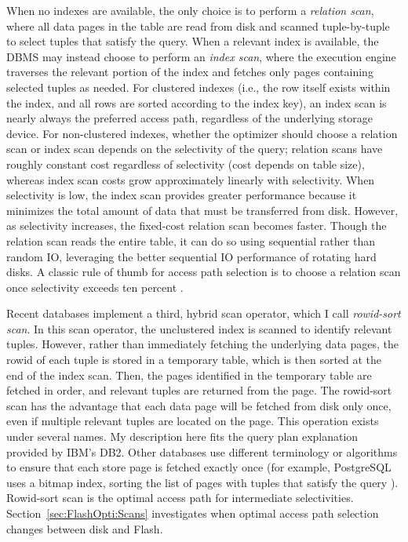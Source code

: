 When no indexes are available, the only choice is to perform a \emph{relation scan}, where all data pages in the table are read from disk and scanned tuple-by-tuple to select tuples that satisfy the query.
When a relevant index is available, the DBMS may instead choose to perform an \emph{index scan}, where the execution engine traverses the relevant portion of the index and fetches only pages containing selected tuples as needed.
For clustered indexes (i.e., the row itself exists within the index, and all rows are sorted according to the index key), an index scan is nearly always the preferred access path, regardless of the underlying storage device.  
For non-clustered indexes, whether the optimizer should choose a relation scan or index scan depends on the selectivity of the query; relation scans have roughly constant cost regardless of selectivity (cost depends on table size), whereas index scan costs grow approximately linearly with selectivity.
When selectivity is low, the index scan provides greater performance because it minimizes the total amount of data that must be transferred from disk.
However, as selectivity increases, the fixed-cost relation scan becomes faster.  
Though the relation scan reads the entire table, it can do so using sequential rather than random IO, leveraging the better sequential IO performance of rotating hard disks.
A classic rule of thumb for access path selection is to choose a relation scan once selectivity exceeds ten percent \cite{RamakrishnanAndGehrke}.

Recent databases implement a third, hybrid scan operator, which I call \emph{rowid-sort scan}.
In this scan operator, the unclustered index is scanned to identify relevant tuples.
However, rather than immediately fetching the underlying data pages, the rowid of each tuple is stored in a temporary table, which is then sorted at the end of the index scan.
Then, the pages identified in the temporary table are fetched in order, and relevant tuples are returned from the page.
The rowid-sort scan has the advantage that each data page will be fetched from disk only once, even if multiple relevant tuples are located on the page. 
This operation exists under several names.
My description here fits the query plan explanation provided by IBM's DB2.
Other databases use different terminology or algorithms to ensure that each store page is fetched exactly once (for example, PostgreSQL uses a bitmap index, sorting the list of pages with tuples that satisfy the query \cite{PostgresLossyBitMap}).
Rowid-sort scan is the optimal access path for intermediate selectivities.
Section~\ref{sec:FlashOpti:Scans} investigates when optimal access path selection changes between disk and Flash.

